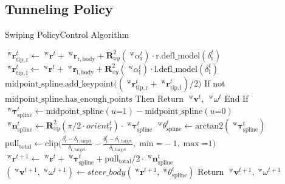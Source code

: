 \documentclass[AIRbeamer
,optEnglish
,optBiber
,optBibstyleAlphabetic
,optBeamerClassicFormat%
]{AIRlatex}
\begin{document}
    \subsection{Tunneling Policy}
    \begin{frame}{Swiping Policy}{Control Algorithm}
        \begin{algorithm}[H]
            \caption{Tunneling Policy Control}
            \begin{algorithmic}[1]
                \State \(\;^{\mathrm{w}}\boldsymbol{r}_{\mathrm{tip, r}}^{t} \gets \;^{\mathrm{w}}\boldsymbol{r}^{t} + \;^{\mathrm{w}}\boldsymbol{r}_{\mathrm{r, body}} + \boldsymbol{R}_{xy}^{2}(\; ^{\mathrm{w}}\alpha_{\mathrm{r}}^{t}) \cdot \mathrm{r.defl\_model}(\delta_{\mathrm{r}}^{t})\)
                \State \(\;^{\mathrm{w}}\boldsymbol{r}_{\mathrm{tip, l}}^{t} \gets \;^{\mathrm{w}}\boldsymbol{r}^{t} + \;^{\mathrm{w}}\boldsymbol{r}_{\mathrm{l, body}} + \boldsymbol{R}_{xy}^{2}(\; ^{\mathrm{w}}\alpha_{\mathrm{l}}^{t}) \cdot \mathrm{l.defl\_model}(\delta_{\mathrm{l}}^{t})\)
                \State \colorbox{yellow!40}{\(\mathrm{midpoint\_spline.add\_keypoint}\big((\;^{\mathrm{w}}\boldsymbol{r}_{\mathrm{tip, r}}^{t} + \;^{\mathrm{w}}\boldsymbol{r}_{\mathrm{tip, l}}^{t}) / 2\big)\)}
                \State If not \(\mathrm{midpoint\_spline.has\_enough\_points}\) Then Return \(\;^{\mathrm{w}}\boldsymbol{v}^{t}\), \(\;^{\mathrm{w}}\omega^{t}\) End If
                \State
                \State \(\;^{\mathrm{w}}\boldsymbol{\tau}_{\mathrm{spline}}^{t} \gets \mathrm{midpoint\_spline}(u\mathord{=}1) - \mathrm{midpoint\_spline}(u\mathord{=}0)\)
                \State \(\;^{\mathrm{w}}\boldsymbol{n}_{\mathrm{spline}}^{t} \gets \boldsymbol{R}_{xy}^{2}(\pi/2 \cdot orient_\mathrm{r}^t)\cdot\;^{\mathrm{w}}\boldsymbol{\tau}_{\mathrm{spline}}^{t}\)
                \State \colorbox{cyan!40}{\(\;^{\mathrm{w}}\theta_{\mathrm{spline}}^{t} \gets \mathrm{arctan2}(\;^{\mathrm{w}}\boldsymbol{\tau}_{\mathrm{spline}}^{t})\)}
                \State \(\mathrm{pull_{total}} \gets \mathrm{clip}\big(\frac{\delta_{\mathrm{r}}^{t} - \delta_{\mathrm{r, target}}}{\delta_{\mathrm{r, target}}} - \frac{\delta_{\mathrm{l}}^{t} - \delta_{\mathrm{l, target}}}{\delta_{\mathrm{l, target}}},\mathrm{\min}\mathord{=}-1, \mathrm{\max}\mathord{=}1\big)\)
                \State \colorbox{green!40}{\(\;^{\mathrm{w}}\boldsymbol{r}^{t+1} \gets \;^{\mathrm{w}}\boldsymbol{r}^{t} + \;^{\mathrm{w}}\boldsymbol{\tau}_{\mathrm{spline}}^{t} + \mathrm{pull_{total}}/2 \cdot \;^{\mathrm{w}}\boldsymbol{n}_{\mathrm{spline}}^{t}\)}
                \State \((\;^{\mathrm{w}}\boldsymbol{v}^{t+1}, \;^{\mathrm{w}}\omega^{t+1}) \gets steer\_body(\;^{\mathrm{w}}\boldsymbol{r}^{t+1},\;^{\mathrm{w}}\theta_{\mathrm{spline}}^{t})\)
                \State Return \(\;^{\mathrm{w}}\boldsymbol{v}^{t+1}, \;^{\mathrm{w}}\omega^{t+1}\)
            \end{algorithmic}
        \end{algorithm}
    \end{frame}
\end{document}
